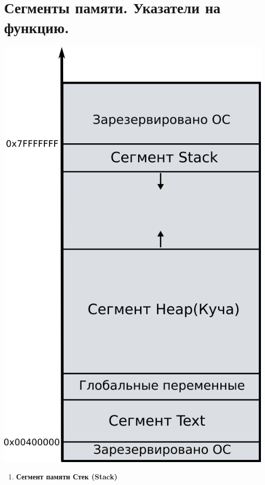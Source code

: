 \documentclass{article}
\begin{document}
\section*{Сегменты памяти. Указатели на функцию.}
\begin{multicols}{2}
\begin{center}
\includegraphics[scale=1.4]{../images/memory_layout.png}
\end{center}
\columnbreak
\begin{enumerate}
\item \textbf{Сегмент памяти Стек (Stack)} \\
\begin{itemize}

\end{itemize}
\end{enumerate}
\end{multicols}
\end{document}
